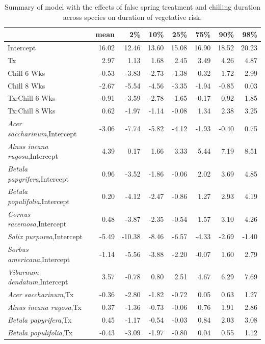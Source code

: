\documentclass{article}\usepackage[]{graphicx}\usepackage[]{color}
\begin{document}
\begin{longtable}{lrrrrrrr}
\caption{Summary of model with the effects of false spring treatment and chilling duration across species on duration of vegetative risk.} \\ 
  \hline
 & mean & 2\% & 10\% & 25\% & 75\% & 90\% & 98\% \\ 
  \hline \endhead  \hline
Intercept & 16.02 & 12.46 & 13.60 & 15.08 & 16.90 & 18.52 & 20.23 \\ 
  Tx & 2.97 & 1.13 & 1.68 & 2.45 & 3.49 & 4.26 & 4.87 \\ 
  Chill 6 Wks & -0.53 & -3.83 & -2.73 & -1.38 & 0.32 & 1.72 & 2.99 \\ 
  Chill 8 Wks & -2.67 & -5.54 & -4.56 & -3.35 & -1.94 & -0.85 & 0.03 \\ 
  Tx:Chill 6 Wks & -0.91 & -3.59 & -2.78 & -1.65 & -0.17 & 0.92 & 1.85 \\ 
  Tx:Chill 8 Wks & 0.62 & -1.97 & -1.14 & -0.08 & 1.34 & 2.38 & 3.25 \\ 
  \textit{Acer saccharinum},Intercept & -3.06 & -7.74 & -5.82 & -4.12 & -1.93 & -0.40 & 0.75 \\ 
  \textit{Alnus incana rugosa},Intercept & 4.39 & 0.17 & 1.66 & 3.33 & 5.44 & 7.19 & 8.51 \\ 
  \textit{Betula papyrifera},Intercept & 0.96 & -3.52 & -1.86 & -0.06 & 2.02 & 3.69 & 4.85 \\ 
  \textit{Betula populifolia},Intercept & 0.20 & -4.12 & -2.47 & -0.86 & 1.27 & 2.93 & 4.19 \\ 
  \textit{Cornus racemosa},Intercept & 0.48 & -3.87 & -2.35 & -0.54 & 1.57 & 3.10 & 4.26 \\ 
  \textit{Salix purpurea},Intercept & -5.49 & -10.38 & -8.46 & -6.57 & -4.33 & -2.69 & -1.40 \\ 
  \textit{Sorbus americana},Intercept & -1.14 & -5.56 & -3.88 & -2.20 & -0.07 & 1.60 & 2.79 \\ 
  \textit{Viburnum dendatum},Intercept & 3.57 & -0.78 & 0.80 & 2.51 & 4.67 & 6.29 & 7.69 \\ 
  \textit{Acer saccharinum},Tx & -0.36 & -2.80 & -1.82 & -0.72 & 0.05 & 0.63 & 1.27 \\ 
  \textit{Alnus incana rugosa},Tx & 0.37 & -1.36 & -0.73 & -0.06 & 0.76 & 1.91 & 2.86 \\ 
  \textit{Betula papyrifera},Tx & 0.45 & -1.17 & -0.54 & -0.03 & 0.84 & 2.03 & 3.08 \\ 
  \textit{Betula populifolia},Tx & -0.43 & -3.09 & -1.97 & -0.80 & 0.04 & 0.55 & 1.12 \\ 

\end{longtable}
\end{document}
